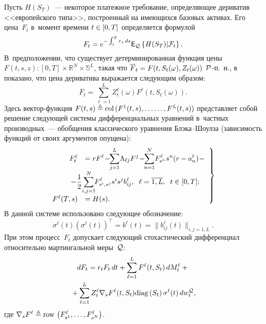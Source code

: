 \begin{multicols}{2}
Пусть $H(S_T)$~--- некоторое платежное требование, определяющее
дериватив <<европейского типа>>, построенный на имеющихся базовых активах.
Его цена~$F_t$ в~момент времени $t \hm\in [0,T]$ определяется формулой
 $$
F_t = e^{-\int\nolimits_t^T r_s\,ds}\mathsf{E}_{ {\mathcal Q} }\left\{ \mathop{H(S_T)|{\mathcal F}_t} \right\}.
$$
В~предположении, что существует детерминированная функция цены $F(t,s,z):[0,T] \times \mathbb{R}^N \times  \mathbb{S}^L$, 
такая что $\overline{F}_t \hm =F(t,S_t(\omega), Z_t(\omega))$ ${\mathcal P}$-п.~н., в~\cite{B_23_1_IA} показано, что цена дериватива 
выражается следующим образом:
$$
\overline{F}_t  =\sum\limits_{\ell=1}^L Z_t^{\ell}(\omega) F^{\ell}(t,S_t(\omega)).
$$ 
Здесь век\-тор-фун\-кция $F(t,s)  \triangleq \col (F^1(t,s),\ldots\linebreak \ldots,F^L(t,s))$ пред\-став\-ля\-ет собой 
решение сле\-ду\-ющей сис\-те\-мы дифференциальных уравнений в~частных производных~--- 
обобщения классического уравнения Блэ\-ка--Шо\-ул\-за (зависимость функций от своих аргументов опущена):
\begin{equation}
\left.
\begin{array}{rl}
\!\!\!\hspace*{-1mm}F_t^{\ell} &= \displaystyle rF^{\ell} \! - \!\! \sum\limits_{j=1}^L \!\Lambda_{\ell j}F^{j} \! - \!\! \sum\limits_{n=1}^N \!F_{s^n}^{\ell}s^n(r - a_n^{\ell}) \! - {}\\[6pt]
&\hspace*{-1mm}\!\!\!\hspace*{-5mm}{}-\! \fr{1}{2} \!\sum\limits_{i,j=1}^N  \!\!F_{s^i,s^j}^{\ell}s^is^j b_{ij}^{\ell},\;\;  \ell=\overline{1,L}, \;\;
t \in [0,T];\\[12pt]
\!\!\!\hspace*{-1mm}F^{\ell}(T,s) &= H(s).
\end{array}\!
\right\}\!\!
\label{eq:F_m_eq}
\end{equation}
В данной системе использовано следующее обозначение:
$$
\sigma^{\ell}(t) \left( \sigma^{\ell}(t) \right)^{\top}= b^{\ell}(t) = \|b_{ij}^{\ell}(t)\|_{i,j=\overline{1,L}}.
$$
При этом процесс~$F_t$ допускает следующий стохастический дифференциал относительно мартингальной меры~${\mathcal Q}$:
\begin{multline}
dF_t =
r_tF_t\,dt + \sum\limits_{\ell=1}^L F^{\ell}(t,S_t)\,dM_t^{\ell} +{}\\
{}+
\sum\limits_{\ell=1}^L Z_t^{\ell} \nabla_s F^{\ell}(t,S_t) \mathrm{diag}\left(S_t\right)
 \sigma^{\ell}(t)\,dw_t^{{\mathcal Q}},
 \label{eq:F_m_obs}
\end{multline}
где $
\nabla_s F^{\ell} \triangleq \mathop{\mathrm{row\,}} \left(
F_{s^1}^{\ell},\ldots, F_{s^N}^{\ell}
\right)$.


\end{multicols}
